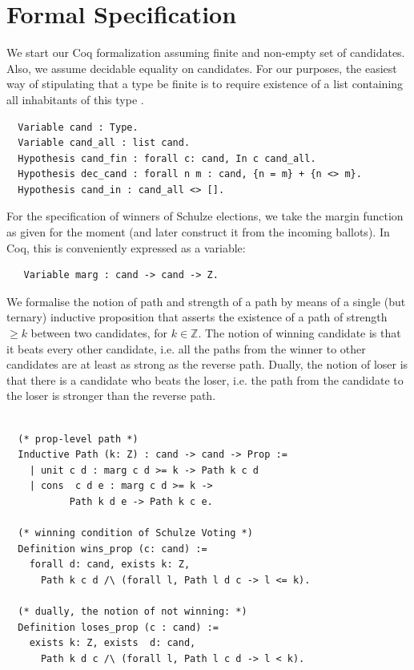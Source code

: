 	
	
\section{Formal Specification} \label{sec:spec}
	We start our Coq formalization assuming finite  and non-empty 
	set of candidates.  Also, we assume decidable equality on 
	candidates. For our purposes, the
	easiest way of stipulating that a type be finite is to require
	existence of a list containing all inhabitants of this type \citep{DBLP:conf/icfp/FirsovU15}.

\begin{verbatim}
  Variable cand : Type.
  Variable cand_all : list cand.
  Hypothesis cand_fin : forall c: cand, In c cand_all.
  Hypothesis dec_cand : forall n m : cand, {n = m} + {n <> m}.
  Hypothesis cand_in : cand_all <> [].
\end{verbatim}

\noindent
For the specification of winners of Schulze elections, we take the
margin function as given for the moment (and later construct it from
the incoming ballots). In Coq, this is conveniently expressed as a
variable:

\begin{verbatim}
   Variable marg : cand -> cand -> Z.   
\end{verbatim}


\noindent
We formalise the notion of path and strength of a path by means of a
single (but ternary) inductive proposition that asserts the
existence of a path of strength $\geq k$ between two candidates, for
$k \in  \mathbb{Z}$. The notion of winning candidate is that it beats every other candidate, i.e.  all the paths from 
the winner to other candidates are at least as strong as the reverse path. Dually, the notion of loser
 is that there is a candidate who beats the loser, i.e. the path from the candidate to the loser is 
 stronger than the reverse path. 

\begin{verbatim}

  (* prop-level path *)
  Inductive Path (k: Z) : cand -> cand -> Prop :=
    | unit c d : marg c d >= k -> Path k c d
    | cons  c d e : marg c d >= k -> 
           Path k d e -> Path k c e.
    
  (* winning condition of Schulze Voting *)
  Definition wins_prop (c: cand) := 
    forall d: cand, exists k: Z,
      Path k c d /\ (forall l, Path l d c -> l <= k).

  (* dually, the notion of not winning: *)
  Definition loses_prop (c : cand) := 
    exists k: Z, exists  d: cand,
      Path k d c /\ (forall l, Path l c d -> l < k).

\end{verbatim}

